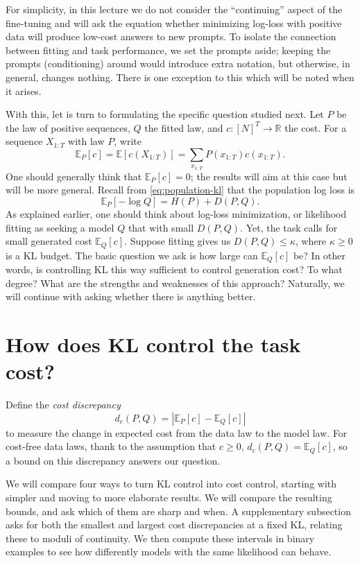 \documentclass[11pt,twoside]{article}
\newcommand{\R}{\mathbb R}
\newcommand{\E}{\mathbb E}
\newcommand{\KL}{D}
\theoremstyle{definition}
\theoremstyle{remark}
\begin{document}
For simplicity, in this lecture we do not consider the ``continuing'' aspect
of the fine-tuning and will ask the equation whether minimizing log-loss
with positive data will produce low-cost answers to new prompts.
To isolate the connection between fitting and task performance, we set the
prompts aside; keeping the prompts (conditioning) around would introduce
extra notation, but otherwise, in general, changes nothing. There is one
exception to this which will be noted when it arises.

With this, let is turn to formulating the specific question studied next.
Let \(P\) be the law of positive sequences, \(Q\) the
fitted law, and \(c:[N]^T\to\R\) the cost. For a sequence
\(X_{1:T}\) with law \(P\), write
\[
  \E_P[c]=\E[c(X_{1:T})]
  =\sum_{x_{1:T}}P(x_{1:T})c(x_{1:T}).
\]
One should generally think that \(\E_P[c]=0\);
the results will aim at this case but will be more general.
Recall from \cref{eq:population-kl} that the population log loss is
\[
 \E_P[-\log Q]=H(P)+\KL(P, Q).
\]
As explained earlier, one should think about log-loss minimization, or
likelihood fitting as seeking a model $Q$ that with small $\KL(P, Q)$.
Yet, the task calls
for small generated cost \(\E_Q[c]\).
Suppose fitting gives us \(\KL(P, Q)\le\kappa\), where \(\kappa\ge0\)
is a KL budget.
The basic question we ask is how large can \(\E_Q[c]\) be?
In other words, is controlling KL this way sufficient to control generation
cost? To what degree? What are the strengths and weaknesses of this approach?
Naturally, we will continue with asking whether there is anything better.

\section{How does KL control the task cost?}
\label{sec:kl-cost}

Define the \emph{cost discrepancy}
\[
 d_c(P,Q)=|\E_P[c]-\E_Q[c]|
\]
to measure the change in expected cost from the data law to the model law.
For cost-free data laws,
thank to the assumption that $c\ge 0$,
\(d_c(P,Q)=\E_Q[c]\), so a bound on this
discrepancy answers our question.

We will compare four ways to turn KL control into cost control, starting with simpler
and moving to more elaborate results.
We will compare the resulting bounds, and ask which of them are sharp and when.
A supplementary subsection asks for both the smallest and largest cost
discrepancies at a fixed KL, relating these to moduli of continuity.
We then compute these intervals in binary examples to see how differently
models with the same likelihood can behave.
\end{document}
